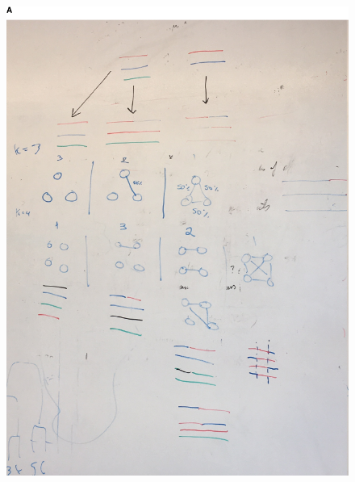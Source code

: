 \documentclass[9pt,lineno]{elife}
\begin{document}
\begin{figure}[htp]
  {\includegraphics[width = \textwidth]{Fig2SimScheme.pdf}}


\end{figure}
\end{document}
